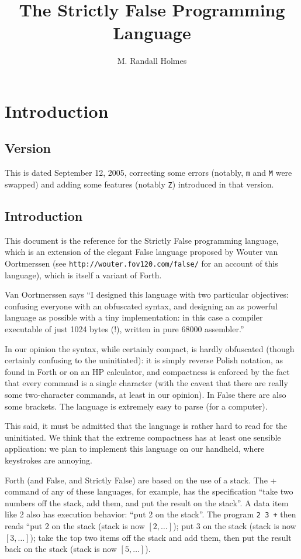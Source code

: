 \documentclass[12pt]{article}
\title{The Strictly False Programming Language}
\author{M. Randall Holmes}
\begin{document}
\maketitle

\section{Introduction}

\subsection{Version}

This is dated September 12, 2005, correcting some errors (notably,
{\tt m} and {\tt M} were swapped) and adding
some features (notably {\tt Z}) introduced in that version.

\subsection{Introduction}

This document is the reference for the Strictly False programming
language, which is an extension of the elegant False language proposed
by Wouter van Oortmerssen (see {\tt http://wouter.fov120.com/false/}
for an account of this language), which is itself a variant of Forth.

Van Oortmerssen says ``I designed this language with two particular
objectives: confusing everyone with an obfuscated syntax, and
designing an as powerful language as possible with a tiny
implementation: in this case a compiler executable of just 1024 bytes
(!), written in pure 68000 assembler.''

In our opinion the syntax, while certainly compact, is hardly
obfuscated (though certainly confusing to the uninitiated): it is
simply reverse Polish notation, as found in Forth or on an HP
calculator, and compactness is enforced by the fact that every command
is a single character (with the caveat that there are really some
two-character commands, at least in our opinion).  In False there are also
some brackets.  The language is extremely easy to parse (for a computer).

This said, it must be admitted that the language is rather hard to
read for the uninitiated.  We think that the extreme compactness has
at least one sensible application: we plan to implement this language
on our handheld, where keystrokes are annoying.

Forth (and False, and Strictly False) are based on the use of a stack.
The + command of any of these languages, for example, has the
specification ``take two numbers off the stack, add them, and put the
result on the stack''.  A data item like 2 also has execution
behavior: ``put 2 on the stack''.  The program {\tt 2 3 +} then reads
``put 2 on the stack (stack is now $[2,\ldots]$); put 3 on the stack
(stack is now $[3,\dots]$); take the top two items off the stack and
add them, then put the result back on the stack (stack is now
$[5,\ldots]$).
\end{document}
